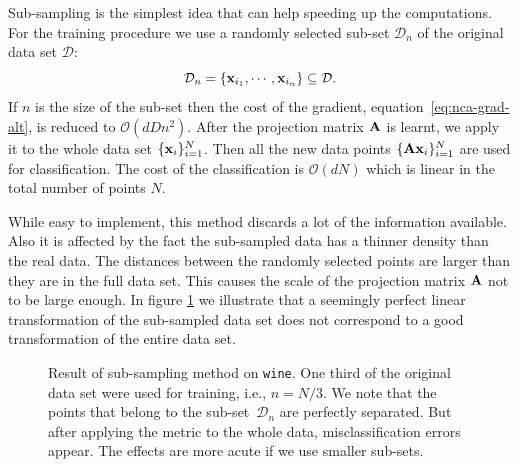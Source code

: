 Sub-sampling is the simplest idea that can help speeding up the computations.
For the training procedure we use a randomly selected sub-set $\mathcal{D}_n$ of
the original data set $\mathcal{D}$:
 \[
 	\mathcal{D}_n = \{ \mathbf{x}_{i_1},\cdots,\mathbf{x}_{i_n} \} \subseteq \mathcal{D}.
 \]
 If $n$ is the size of the sub-set then the cost of the gradient, equation~\eqref{eq:nca-grad-alt}, is reduced to
$\mathcal{O}(dDn^2)$. After the projection matrix $\mathbf{A}$ is learnt, we apply it to the whole data set $\{\mathbf{x}_i\}_{i=1}^N$. Then all the new data points $\{\mathbf{A}\mathbf{x}_i\}_{i=1}^N$ are used for
classification. The cost of the classification is $\mathcal{O}(dN)$ which is linear in the total number of points $N$.

While easy to implement, this method discards a lot of the information available.
Also it is affected by the fact the sub-sampled data has a thinner density
than the real data. The distances between the randomly selected points are larger than they are in the full data set. This causes the scale of the projection matrix $\mathbf{A}$ not to be large enough. In figure \ref{fig:sub-sampling} we illustrate that a seemingly perfect linear transformation of the sub-sampled data set does not correspond to a good transformation of the entire data set.

\begin{figure}
  \centering
  \caption[Associated problems with sub-sampling method]{Result of sub-sampling method on \texttt{wine}. One
third of the original data set were used for training, i.e., $n = N/3$. We note
that the points that belong to the sub-set~$\mathcal{D}_n$ are perfectly
separated. But after applying the metric to the whole data, misclassification errors appear. The effects are more acute if we use smaller
sub-sets.}
  \label{fig:sub-sampling}
\end{figure}


